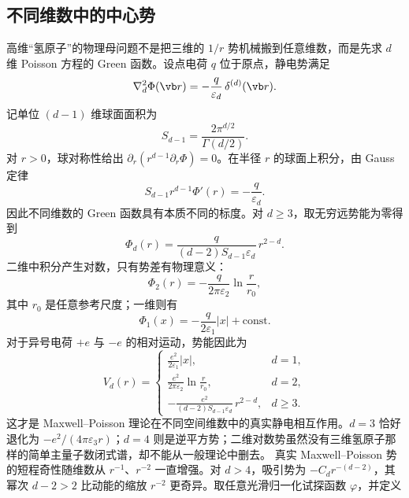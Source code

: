 \subsection{不同维数中的中心势}
\label{sec:phys-hdqm-maxwell-poisson}
高维“氢原子”的物理母问题不是把三维的 $1/r$ 势机械搬到任意维数，而是先求 $d$ 维 Poisson 方程的 Green 函数。设点电荷 $q$ 位于原点，静电势满足
\begin{equation}\label{eq:phys-hdqm-poisson-d}
 \nabla_d^2\Phi(\vb r)=-\frac{q}{\varepsilon_d}\,\delta^{(d)}(\vb r).
\end{equation}
记单位 $(d-1)$ 维球面面积为
\[
 S_{d-1}=\frac{2\pi^{d/2}}{\Gamma(d/2)}.
\]
对 $r>0$，球对称性给出 $\partial_r(r^{d-1}\partial_r\Phi)=0$。在半径 $r$ 的球面上积分，由 Gauss 定律
\begin{equation}\label{eq:phys-hdqm-gauss-d}
 S_{d-1}r^{d-1}\Phi'(r)=-\frac{q}{\varepsilon_d}.
\end{equation}
因此不同维数的 Green 函数具有本质不同的标度。对 $d\ge3$，取无穷远势能为零得到
\begin{equation}\label{eq:phys-hdqm-potential-d-ge3}
 \Phi_d(r)=\frac{q}{(d-2)S_{d-1}\varepsilon_d}\,r^{2-d}.
\end{equation}
二维中积分产生对数，只有势差有物理意义：
\begin{equation}\label{eq:phys-hdqm-potential-d2}
 \Phi_2(r)=-\frac{q}{2\pi\varepsilon_2}\ln\frac{r}{r_0},
\end{equation}
其中 $r_0$ 是任意参考尺度；一维则有
\begin{equation}\label{eq:phys-hdqm-potential-d1}
 \Phi_1(x)=-\frac{q}{2\varepsilon_1}|x|+\mathrm{const}.
\end{equation}
对于异号电荷 $+e$ 与 $-e$ 的相对运动，势能因此为
\begin{equation}\label{eq:phys-hdqm-coulomb-potential-all-d}
 V_d(r)=
 \begin{cases}
 \displaystyle \frac{e^2}{2\varepsilon_1}|x|, & d=1,\\[0.8em]
 \displaystyle \frac{e^2}{2\pi\varepsilon_2}\ln\frac{r}{r_0}, & d=2,\\[0.8em]
 \displaystyle -\frac{e^2}{(d-2)S_{d-1}\varepsilon_d}\,r^{2-d}, & d\ge3.
 \end{cases}
\end{equation}
这才是 Maxwell--Poisson 理论在不同空间维数中的真实静电相互作用。$d=3$ 恰好退化为 $-e^2/(4\pi\varepsilon_3r)$；$d=4$ 则是逆平方势；二维对数势虽然没有三维氢原子那样的简单主量子数闭式谱，却不能从一般理论中删去。
真实 Maxwell--Poisson 势的短程奇性随维数从 $r^{-1}$、$r^{-2}$ 一直增强。对 $d>4$，吸引势为 $-C_dr^{-(d-2)}$，其幂次 $d-2>2$ 比动能的缩放 $r^{-2}$ 更奇异。取任意光滑归一化试探函数 $\varphi$，并定义
